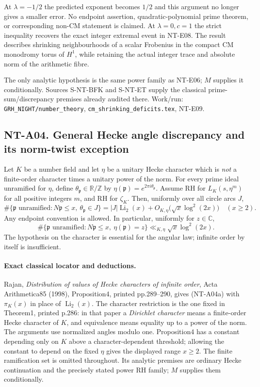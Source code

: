 At $\lambda=-1/2$ the predicted exponent becomes $1/2$ and this
argument no longer gives a smaller error. No endpoint assertion,
quadratic-polynomial prime theorem, or corresponding non-CM
statement is claimed. At $\lambda=0,c=1$ the strict inequality
recovers the exact integer extremal event in NT-E08. The result
describes shrinking neighbourhoods of a scalar Frobenius in the
compact CM monodromy torus of $H^1$, while retaining the actual
integer trace and absolute norm of the arithmetic fibre.

The only analytic hypothesis is the same power family as NT-E06;
$M$ supplies it conditionally. Sources S-NT-BFK and S-NT-ET supply
the classical prime-sum/discrepancy premises already audited there.
Work/run: \texttt{GRH\_NIGHT/number\_theory},
\texttt{cm\_shrinking\_deficits.tex}, NT-E09.

\subsection*{NT-A04. General Hecke angle discrepancy and its norm-twist exception}
Let $K$ be a number field and let $\eta$ be a unitary Hecke character
which is \emph{not} a finite-order character times a unitary power
of the norm. For every prime ideal unramified for $\eta$, define
$\theta_{\mathfrak p}\in\mathbb R/\mathbb Z$ by
$\eta(\mathfrak p)=e^{2\pi i\theta_{\mathfrak p}}$.
Assume RH for $L_K(s,\eta^m)$ for all positive integers $m$, and RH
for $\zeta_K$. Then, uniformly over all circle arcs $J$,
\[
 \#\{\mathfrak p\text{ unramified}:N\mathfrak p\le x,\
                          \theta_{\mathfrak p}\in J\}
 =|J|\operatorname{Li}_2(x)
       +O_{K,\eta}\bigl(\sqrt x\log^2(2x)\bigr)
 \quad(x\ge2).                                         \tag{NT-A04a}
\]
Any endpoint convention is allowed. In particular, uniformly for
$z\in\mathbb C$,
\[
 \#\{\mathfrak p\text{ unramified}:N\mathfrak p\le x,\
                                  \eta(\mathfrak p)=z\}
       \ll_{K,\eta}\sqrt x\log^2(2x).                    \tag{NT-A04b}
\]
The hypothesis on the character is essential for the angular law;
infinite order by itself is insufficient.

\paragraph{Exact classical locator and deductions.}
Rajan, \emph{Distribution of values of Hecke characters of infinite
order}, Acta Arithmetica85 (1998), Proposition4, printed
pp.289--290, gives (NT-A04a) with $\pi_K(x)$ in place of
$\operatorname{Li}_2(x)$. The character restriction is the one fixed
in Theorem1, printed p.286: in that paper a \emph{Dirichlet character}
means a finite-order Hecke character of $K$, and equivalence means
equality up to a power of the norm. The arguments use normalized
angles modulo one. Proposition4 has a constant depending only on
$K$ above a character-dependent threshold; allowing the constant
to depend on the fixed $\eta$ gives the displayed range $x\ge2$.
The finite ramification set is omitted throughout. Its analytic
premises are ordinary Hecke continuation and the precisely stated
power RH family; $M$ supplies them conditionally.

